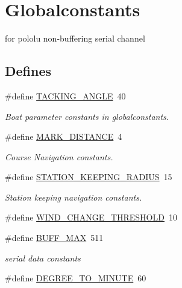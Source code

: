 \hypertarget{group__globalconstants}{
\section{\-Globalconstants}
\label{group__globalconstants}
}


for pololu non-\/buffering serial channel  


\subsection*{\-Defines}
\begin{DoxyCompactItemize}
\item 
\#define \hyperlink{group__globalconstants_ga2cf0d7fd0783e401cdb0dc31e2179673}{\-T\-A\-C\-K\-I\-N\-G\-\_\-\-A\-N\-G\-L\-E}~40
\begin{DoxyCompactList}\small\item\em \-Boat parameter constants in globalconstants. \end{DoxyCompactList}\item 
\#define \hyperlink{group__globalconstants_ga19af76681fc030672f41555a55f8e8db}{\-M\-A\-R\-K\-\_\-\-D\-I\-S\-T\-A\-N\-C\-E}~4
\begin{DoxyCompactList}\small\item\em \-Course \-Navigation constants. \end{DoxyCompactList}\item 
\#define \hyperlink{group__globalconstants_ga90af33a69f96f733c581db0261bc1676}{\-S\-T\-A\-T\-I\-O\-N\-\_\-\-K\-E\-E\-P\-I\-N\-G\-\_\-\-R\-A\-D\-I\-U\-S}~15
\begin{DoxyCompactList}\small\item\em \-Station keeping navigation constants. \end{DoxyCompactList}\item 
\#define \hyperlink{group__globalconstants_ga0e751f6a929915f9b2ea482bc096d3ca}{\-W\-I\-N\-D\-\_\-\-C\-H\-A\-N\-G\-E\-\_\-\-T\-H\-R\-E\-S\-H\-O\-L\-D}~10
\item 
\#define \hyperlink{group__globalconstants_ga2c1c653e45c4962f05cb6341f359707d}{\-B\-U\-F\-F\-\_\-\-M\-A\-X}~511
\begin{DoxyCompactList}\small\item\em serial data constants \end{DoxyCompactList}\item 
\#define \hyperlink{group__globalconstants_gaa0fe8a3893ebea828d2bb49ef23e3530}{\-D\-E\-G\-R\-E\-E\-\_\-\-T\-O\-\_\-\-M\-I\-N\-U\-T\-E}~60

\end{DoxyCompactItemize}

